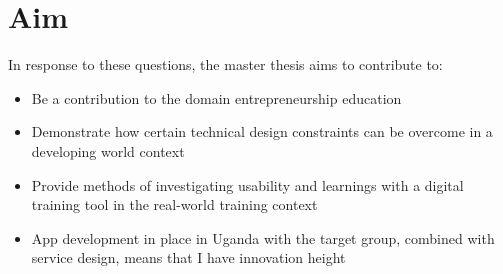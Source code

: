 \section{Aim}

In response to these questions, the master thesis aims to contribute to: %

\begin{itemize}
    \item Be a contribution to the domain entrepreneurship education
    \item Demonstrate how certain technical \/ design constraints can be overcome in a developing world context %
    \item Provide methods of investigating usability and learnings with a digital training tool in the real-world training context %
\item App development in place in Uganda with the target group, combined with service design, means that I have innovation height
\end{itemize}